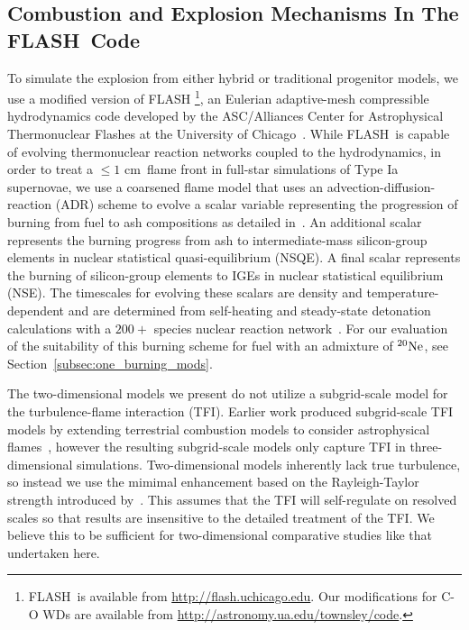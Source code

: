 \documentclass[iop,apj]{emulateapj}
\newcommand{\secref}[1]{Section~\ref{#1}}
\newcommand{\Ne}[1]{\ensuremath{{}^{#1}{\rm Ne}}}
\newcommand{\code}[1]{\textsc{#1}}
\newcommand{\FLASH}{\code{FLASH}}
\newcommand{\unitstyle}[1]{\ensuremath{\mathrm{#1}}}
\newcommand{\centi}{\unitstyle{c}}
\newcommand{\meter}{\unitstyle{m}}
\newcommand{\cm}{\centi\meter}
\begin{document}
\subsection{Combustion and Explosion Mechanisms In The \FLASH\ Code} 
\label{subsec:flash_flame}
To simulate the explosion from either hybrid or traditional
progenitor models, we use a modified version of \FLASH 
\footnote{\FLASH\ is available from
  \url{http://flash.uchicago.edu}. Our modifications for C-O WDs are
  available from \url{http://astronomy.ua.edu/townsley/code}.}, an
Eulerian adaptive-mesh compressible hydrodynamics code developed by
the ASC/Alliances Center for Astrophysical Thermonuclear Flashes at
the University of Chicago~\citep{Fryxetal00, calder.fryxell.ea:on}.
While \FLASH\ is capable of evolving thermonuclear reaction networks
coupled to the hydrodynamics, in order to treat a $ \le 1$ \cm\ flame
front in full-star simulations of Type Ia supernovae, we use a
coarsened flame model that uses an advection-diffusion-reaction (ADR)
scheme to evolve a scalar variable representing the progression of
burning from fuel to ash compositions as detailed
in~\citet{Caldetal07, townsley.calder.ea:flame,townetal2009}. An
additional scalar represents the burning progress from ash to
intermediate-mass silicon-group elements in nuclear statistical
quasi-equilibrium (NSQE). A final scalar represents the burning of
silicon-group elements to IGEs in nuclear statistical equilibrium
(NSE). The timescales for evolving these scalars are density and
temperature-dependent and are determined from self-heating and
steady-state detonation calculations with a $200+$ species nuclear
reaction network~\citep{Caldetal07,townetal15}. For our evaluation of
the suitability of this burning scheme for fuel with an admixture of
\Ne{20}, see \secref{subsec:one_burning_mods}.

The two-dimensional models we present do not utilize a subgrid-scale
model for the turbulence-flame interaction (TFI). Earlier work
produced subgrid-scale TFI models by extending terrestrial combustion
models to consider astrophysical flames~\citep{Schmetal06a,
  Schmetal06b, jacketal2014}, however the resulting subgrid-scale
models only capture TFI in three-dimensional
simulations. Two-dimensional models inherently lack true turbulence,
so instead we use the mimimal enhancement based on the Rayleigh-Taylor
strength introduced by~\citet{townsley.calder.ea:flame}. This assumes
that the TFI will self-regulate on resolved scales so that results are
insensitive to the detailed treatment of the TFI. We believe this to
be sufficient for two-dimensional comparative studies like that
undertaken here.
\end{document}
